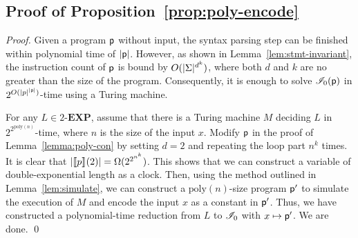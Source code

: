 \documentclass[runningheads]{llncs}
\begin{document}
\subsection{Proof of Proposition~\ref{prop:poly-encode}}
\begin{proof}
Given a program $\mathsf{p}$ without input, the syntax parsing step can be finished within polynomial time of $\vert\mathsf{p}\vert$.
However, as shown in Lemma~\ref{lem:stmt-invariant}, the instruction count of $\mathsf{p}$ is bound by $O(\vert\Sigma\vert^{d^{k}})$, where both $d$ and $k$ are no greater than the size of the program.
Consequently, it is enough to solve $\mathscr{I}_0(\mathsf{p})$ in $2^{O(\vert p\vert^{\vert\mathsf{p}\vert})}$-time using a Turing machine.

For any $L \in 2$-$\mathbf{EXP}$, assume that there is a Turing machine $M$ deciding $L$ in $2^{2^{\mathrm{poly}(n)}}$-time, where $n$ is the size of the input $x$.
Modify $\mathsf{p}$ in the proof of Lemma~\ref{lemma:poly-con} by setting $d=2$ and repeating the loop part $n^{k}$ times. It is clear that $\vert\llbracket p\rrbracket_{}(2)\vert=\Omega(2^{2^{n^{k}}})$.
This shows that we can construct a variable of double-exponential length as a clock.
Then, using the method outlined in Lemma~\ref{lem:simulate}, we can construct a $\mathrm{poly}(n)$-size program $\mathsf{p}'$ to simulate the execution of $M$ and encode the input $x$ as a constant in $\mathsf{p}'$.
Thus, we have constructed a polynomial-time reduction from $L$ to $\mathscr{I}_0$ with $x\mapsto\mathsf{p}'$.
We are done.
\qed
\end{proof}
\end{document}
